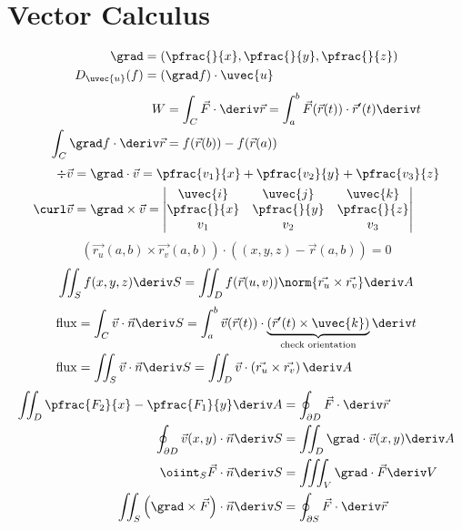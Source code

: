 \documentclass[10pt, a4paper]{article}
\begin{document}
\section{Vector Calculus}
\begin{multicols}{2}

    \begin{align*}
        \grad &= \left(\pfrac{}{x}, \pfrac{}{y}, \pfrac{}{z}\right) \\
        D_{\uvec{u}}(f) &= \left(\grad f\right) \cdot \uvec{u}
    \end{align*}
    \begin{align*}
        W &= \int_{C} \vec{F} \cdot \deriv \vec{r} 
            = \int_{a}^{b} \vec{F}(\vec{r}(t)) \cdot \vec{r}'(t) \deriv t \\
        \int_{C} \grad f \cdot \deriv \vec{r} &= f(\vec{r}(b)) - f(\vec{r}(a))
    \end{align*}
    \begin{align*}
        \div \vec{v} &= \grad \cdot \vec{v} = \pfrac{v_1}{x} + \pfrac{v_2}{y} + \pfrac{v_3}{z} \\
        \curl \vec{v} &= \grad \times \vec{v} = 
            \begin{vmatrix}
                \uvec{i} & \uvec{j} & \uvec{k} \\
                \pfrac{}{x} & \pfrac{}{y} & \pfrac{}{z} \\
                v_1 & v_2 & v_3
            \end{vmatrix}
    \end{align*}
    \[
        \left(\vec{r_{u}}(a, b) \times \vec{r_{v}}(a, b)\right) \cdot
        \left((x, y, z) - \vec{r}(a, b) \right) = 0
    \]
    \[
        \iint_{S} f(x, y, z) \deriv S =
        \iint_{D} f(\vec{r}(u, v)) \norm{\vec{r_{u}} \times \vec{r_{v}}} \deriv A
    \]
    \vfill\columnbreak
    \begin{align*}
        \mathrm{flux} &= \int_{C} \vec{v} \cdot \vec{n} \deriv S 
            = \int_{a}^{b} \vec{v}(\vec{r}(t)) \cdot
            \underbrace{
                \left( \vec{r} '(t) \times \uvec{k} \right)
            }_{\text{check orientation}}
            \deriv t \\
        \mathrm{flux} &= \iint_{S} \vec{v} \cdot \vec{n} \deriv S =
            \iint_{D} \vec{v} \cdot \left(\vec{r_{u}} \times \vec{r_{v}}\right) \deriv A \\
    \end{align*}
    \begin{align*}
        \iint_{D} \pfrac{F_2}{x} - \pfrac{F_1}{y} \deriv A 
            &= \oint_{\partial D} \vec{F} \cdot \deriv \vec{r} \\
        \oint_{\partial D} \vec{v}(x, y) \cdot \vec{n} \deriv S
            &= \iint_{D} \grad \cdot \vec{v}(x, y) \deriv A \\
        \oiint_{S} \vec{F} \cdot \vec{n} \deriv S 
            &= \iiint_{V} \grad \cdot \vec{F} \deriv V \\
        \iint_{S} \left(\grad \times \vec{F}\right) \cdot \vec{n} \deriv S
            &= \oint_{\partial S} \vec{F} \cdot \deriv \vec{r}
    \end{align*}
\end{multicols}
\end{document}
